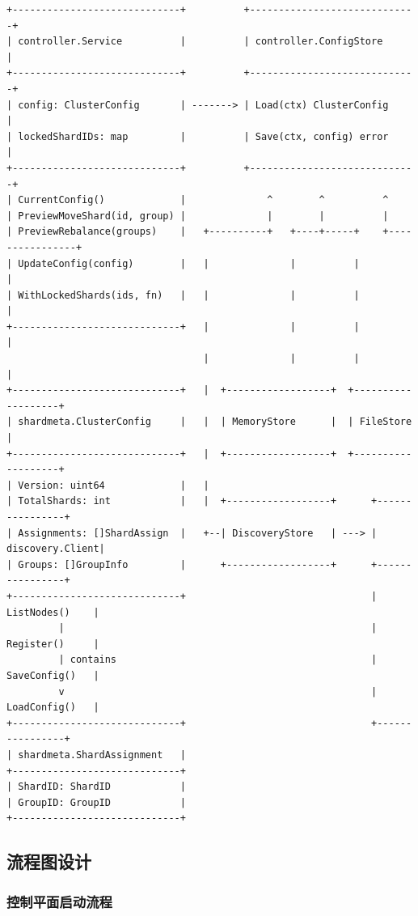 \documentclass[UTF8,a4paper,12pt]{ctexart}
\begin{document}
\begin{lstlisting}[style=asciiart,caption={控制平面元数据管理类图}]
+-----------------------------+          +-----------------------------+
| controller.Service          |          | controller.ConfigStore      |
+-----------------------------+          +-----------------------------+
| config: ClusterConfig       | -------> | Load(ctx) ClusterConfig     |
| lockedShardIDs: map         |          | Save(ctx, config) error     |
+-----------------------------+          +-----------------------------+
| CurrentConfig()             |              ^        ^          ^
| PreviewMoveShard(id, group) |              |        |          |
| PreviewRebalance(groups)    |   +----------+   +----+-----+    +----------------+
| UpdateConfig(config)        |   |              |          |                     |
| WithLockedShards(ids, fn)   |   |              |          |                     |
+-----------------------------+   |              |          |                     |
                                  |              |          |                     |
+-----------------------------+   |  +------------------+  +-------------------+
| shardmeta.ClusterConfig     |   |  | MemoryStore      |  | FileStore         |
+-----------------------------+   |  +------------------+  +-------------------+
| Version: uint64             |   |
| TotalShards: int            |   |  +------------------+      +----------------+
| Assignments: []ShardAssign  |   +--| DiscoveryStore   | ---> | discovery.Client|
| Groups: []GroupInfo         |      +------------------+      +----------------+
+-----------------------------+                                | ListNodes()    |
         |                                                     | Register()     |
         | contains                                            | SaveConfig()   |
         v                                                     | LoadConfig()   |
+-----------------------------+                                +----------------+
| shardmeta.ShardAssignment   |
+-----------------------------+
| ShardID: ShardID            |
| GroupID: GroupID            |
+-----------------------------+
\end{lstlisting}

\subsection{流程图设计}

\subsubsection{控制平面启动流程}
\end{document}
